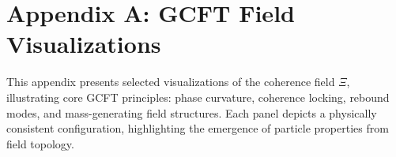 \section*{Appendix A: GCFT Field Visualizations}

This appendix presents selected visualizations of the coherence field $\Xi$, illustrating core GCFT principles: phase curvature, coherence locking, rebound modes, and mass-generating field structures. Each panel depicts a physically consistent configuration, highlighting the emergence of particle properties from field topology.

\vspace{1em}

\renewcommand{\thefigure}{A\arabic{figure}}
\setcounter{figure}{0}

